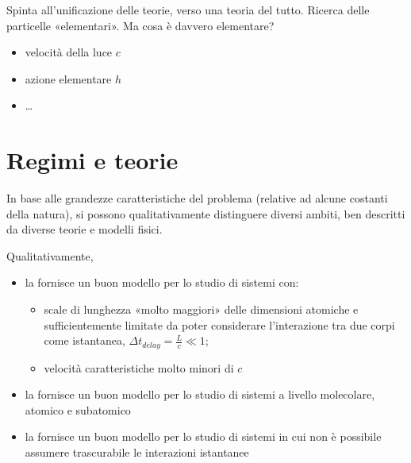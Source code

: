 \documentclass[letterpaper,10pt,italian]{jupyterBook}
\begin{document}
\sphinxAtStartPar
Spinta all’unificazione delle teorie, verso una teoria del tutto. Ricerca delle particelle «elementari». Ma cosa è davvero elementare?

\sphinxAtStartPar
{}
\begin{itemize}
\item {} 
\sphinxAtStartPar
velocità della luce \(c\)

\item {} 
\sphinxAtStartPar
azione elementare \(h\)

\item {} 
\sphinxAtStartPar
…

\end{itemize}


\section{Regimi e teorie}
\label{\detokenize{ch/intro/current-status:regimi-e-teorie}}\label{\detokenize{ch/intro/current-status:physics-hs-intro-current-status-regimes}}
\sphinxAtStartPar
In base alle grandezze caratteristiche del problema (relative ad alcune costanti della natura), si possono qualitativamente distinguere diversi ambiti, ben descritti da diverse teorie e modelli fisici.

\sphinxAtStartPar
Qualitativamente,
\begin{itemize}
\item {} 
\sphinxAtStartPar
la  fornisce un buon modello per lo studio di sistemi con:
\begin{itemize}
\item {} 
\sphinxAtStartPar
scale di lunghezza «molto maggiori» delle dimensioni atomiche e sufficientemente limitate da poter considerare l’interazione tra due corpi come istantanea, \(\Delta t_{delay} = \frac{L}{c} \ll 1\);

\item {} 
\sphinxAtStartPar
velocità caratteristiche molto minori di \(c\)

\end{itemize}

\item {} 
\sphinxAtStartPar
la  fornisce un buon modello per lo studio di sistemi a livello molecolare, atomico e sub\sphinxhyphen{}atomico

\item {} 
\sphinxAtStartPar
la  fornisce un buon modello per lo studio di sistemi in cui non è possibile assumere trascurabile le interazioni istantanee

\end{itemize}
\end{document}

